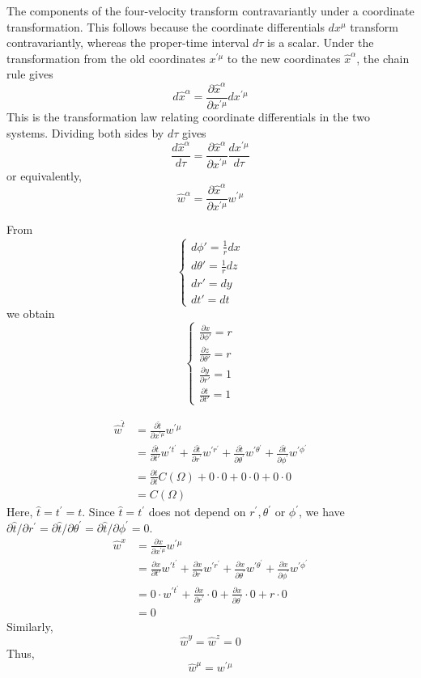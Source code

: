 \documentclass[english]{article}
\begin{document}
The components of the four-velocity transform contravariantly under
a coordinate transformation. This follows because the coordinate differentials
$dx^{\mu}$ transform contravariantly, whereas the proper-time interval
$d\tau$ is a scalar. Under the transformation from the old coordinates
$x^{'\mu}$ to the new coordinates $\hat{x}^{\alpha}$, the chain
rule gives 
\[
d\hat{x}^{\alpha}=\frac{\partial\hat{x}^{\alpha}}{\partial x^{'\mu}}dx^{'\mu}
\]
 This is the transformation law relating coordinate differentials
in the two systems. Dividing both sides by $d\tau$ gives 
\[
\frac{d\hat{x}^{\alpha}}{d\tau}=\frac{\partial\hat{x}^{\alpha}}{\partial x^{'\mu}}\frac{dx^{'\mu}}{d\tau}
\]
 or equivalently, 
\[
\hat{w}^{\alpha}=\frac{\partial\hat{x}^{\alpha}}{\partial x^{'\mu}}w^{'\mu}
\]

From 
\[
\begin{cases}
d\phi'=\frac{1}{r}dx\\
d\theta'=\frac{1}{r}dz\\
dr'=dy\\
dt'=dt
\end{cases}
\]
 we obtain 
\[
\begin{cases}
\frac{\partial x}{\partial\phi'}=r\\
\frac{\partial z}{\partial\theta'}=r\\
\frac{\partial y}{\partial r'}=1\\
\frac{\partial t}{\partial t'}=1
\end{cases}
\]

\begin{align*}
\hat{w}^{\hat{t}} & =\frac{\partial\hat{t}}{\partial x^{'\mu}}w^{'\mu}\\
 & =\frac{\partial\hat{t}}{\partial t'}w^{'t^{'}}+\frac{\partial\hat{t}}{\partial r^{'}}w^{'r^{'}}+\frac{\partial\hat{t}}{\partial\theta^{'}}w^{'\theta^{'}}+\frac{\partial\hat{t}}{\partial\phi^{'}}w^{'\phi^{'}}\\
 & =\frac{\partial t}{\partial t}C\left(\Omega\right)+0\cdot0+0\cdot0+0\cdot0\\
 & =C\left(\Omega\right)
\end{align*}
 Here, $\hat{t}=t^{'}=t$. Since $\hat{t}=t^{'}$ does not depend
on $r^{'},\theta^{'}$ or $\phi^{'}$, we have $\partial\hat{t}/\partial r^{'}=\partial\hat{t}/\partial\theta^{'}=\partial\hat{t}/\partial\phi^{'}=0$.
\begin{align*}
\hat{w}^{x} & =\frac{\partial x}{\partial x^{'\mu}}w^{'\mu}\\
 & =\frac{\partial x}{\partial t'}w^{'t^{'}}+\frac{\partial x}{\partial r^{'}}w^{'r^{'}}+\frac{\partial x}{\partial\theta^{'}}w^{'\theta^{'}}+\frac{\partial x}{\partial\phi^{'}}w^{'\phi^{'}}\\
 & =0\cdot w^{'t^{'}}+\frac{\partial x}{\partial r^{'}}\cdot0+\frac{\partial x}{\partial\theta^{'}}\cdot0+r\cdot0\\
 & =0
\end{align*}
 Similarly, 
\[
\hat{w}^{y}=\hat{w}^{z}=0
\]
 Thus, 
\[
\hat{w}^{\mu}=w^{'\mu}
\]
\end{document}
